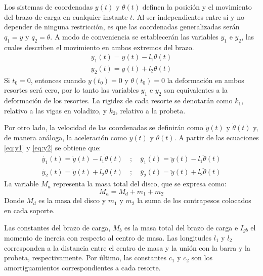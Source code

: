 Los sistemas de coordenadas $y(t)$ y $\theta (t)$ definen la posición y el movimiento del brazo de carga en cualquier instante $t$. Al ser independientes entre sí y no depender de ninguna restricción, es que las coordenadas generalizadas serán $q_1 = y$ y $q_2 = \theta$. A modo de conveniencia se establecerán las variables $y_1$ e $y_2$, las cuales describen el movimiento en ambos extremos del brazo.
\begin{gather}
	y_1(t) = y(t) - l_1\theta(t) \label{eq:y1}\\
	y_2(t) = y(t) + l_2\theta(t) \label{eq:y2}
\end{gather}
Si $t_0=0$, entonces cuando $y(t_0) = 0$ y $\theta(t_0) = 0$ la deformación en ambos resortes será cero, por lo tanto las variables $y_1$ e $y_2$ son equivalentes a la deformación de los resortes. La rigidez de cada resorte se denotarán como $k_1$, relativo a las vigas en voladizo, y $k_2$, relativo a la probeta.

Por otro lado, la velocidad de las coordenadas se definirán como $\dot{y}(t)$ y $\dot{\theta}(t)$ y, de manera análoga, la aceleración como $\ddot{y}(t)$ y $\ddot{\theta}(t)$. A partir de las ecuaciones \ref{eq:y1} y \ref{eq:y2} se obtiene que:
\begin{gather*}
	\dot{y_1}(t) = \dot{y}(t) - l_1\dot{\theta}(t) \quad ;\quad \ddot{y_1}(t) = \ddot{y}(t) - l_1\ddot{\theta}(t) \\
 	\dot{y_2}(t) = \dot{y}(t) + l_2\dot{\theta}(t) \quad ;\quad \ddot{y_2}(t) = \ddot{y}(t) + l_2\ddot{\theta}(t) 
\end{gather*}
La variable $M_a$ representa la masa total del disco, que se expresa como:
\begin{equation}\label{eq:m_a}
	M_a = M_d + m_1 + m_2
\end{equation}
Donde $M_d$ es la masa del disco y $m_1$ y $m_2$ la suma de los contrapesos colocados en cada soporte. 

Las constantes del brazo de carga, $M_b$ es la masa total del brazo de carga e $I_{gb}$ el momento de inercia con respecto al centro de masa. Las longitudes $l_1$ y $l_2$ corresponden a la distancia entre el centro de masa y la unión con la barra y la probeta, respectivamente. Por último, las constantes $c_1$ y $c_2$ son los amortiguamientos correspondientes a cada resorte.

